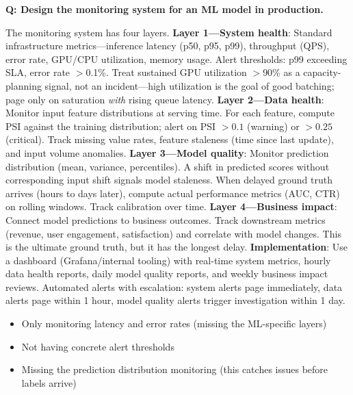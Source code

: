 \begin{interviewq}
\textbf{Q: Design the monitoring system for an ML model in production.}

 \quad {} \quad \badgefreq{\freqmed}

\stronganswer The monitoring system has four layers. \textbf{Layer 1---System health}: Standard infrastructure metrics---inference latency (p50, p95, p99), throughput (QPS), error rate, GPU/CPU utilization, memory usage. Alert thresholds: p99 exceeding SLA, error rate $>$0.1\%. Treat sustained GPU utilization $>$90\% as a capacity-planning signal, not an incident---high utilization is the goal of good batching; page only on saturation \textit{with} rising queue latency. \textbf{Layer 2---Data health}: Monitor input feature distributions at serving time. For each feature, compute PSI against the training distribution; alert on PSI $> 0.1$ (warning) or $> 0.25$ (critical). Track missing value rates, feature staleness (time since last update), and input volume anomalies. \textbf{Layer 3---Model quality}: Monitor prediction distribution (mean, variance, percentiles). A shift in predicted scores without corresponding input shift signals model staleness. When delayed ground truth arrives (hours to days later), compute actual performance metrics (AUC, CTR) on rolling windows. Track calibration over time. \textbf{Layer 4---Business impact}: Connect model predictions to business outcomes. Track downstream metrics (revenue, user engagement, satisfaction) and correlate with model changes. This is the ultimate ground truth, but it has the longest delay. \textbf{Implementation}: Use a dashboard (Grafana/internal tooling) with real-time system metrics, hourly data health reports, daily model quality reports, and weekly business impact reviews. Automated alerts with escalation: system alerts page immediately, data alerts page within 1 hour, model quality alerts trigger investigation within 1 day.

\redflags
\begin{itemize}
    \item Only monitoring latency and error rates (missing the ML-specific layers)
    \item Not having concrete alert thresholds
    \item Missing the prediction distribution monitoring (this catches issues before labels arrive)
\end{itemize}



\end{interviewq}
